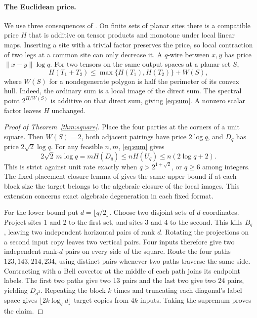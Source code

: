 \documentclass[11pt]{article}
\begin{document}
\paragraph{The Euclidean price.}
We use three consequences of \cite[Thm.~1.1 and the calculus of prices]{price}.
On finite sets of planar sites there is a compatible price \(H\) that is
additive on tensor products and monotone under local linear maps.
Inserting a site with a trivial factor preserves the price, so local
contraction of two legs at a common site can only decrease it.
A \(q\)-wire between \(x,y\) has price \(\|x-y\|\log q\).
For two tensors on the same output spaces at a planar set \(S\),
\begin{equation}\label{eq:sum}
 H(T_1+T_2)\le \max\{H(T_1),H(T_2)\}+W(S),
\end{equation}
where \(W(S)\) for a nondegenerate polygon is half the perimeter of its
convex hull. Indeed, the ordinary sum is a local image of the direct sum.
The spectral point \(2^{H/W(S)}\) is additive on that direct sum, giving
\eqref{eq:sum}. A nonzero scalar factor leaves \(H\) unchanged.

\begin{proof}[Proof of Theorem~\ref{thm:square}]
Place the four parties at the corners of a unit square. Then \(W(S)=2\),
both adjacent pairings have price \(2\log q\), and \(D_q\) has price
\(2\sqrt2\log q\). For any feasible \(n,m\), \eqref{eq:sum} gives
\[
 2\sqrt2\,m\log q=mH(D_q)\le nH(U_q)\le n(2\log q+2).
\]
This is strict against unit rate exactly when \(q>2^{1+\sqrt2}\),
or \(q\ge6\) among integers. The fixed-placement closure lemma of
\cite{price} gives the same upper bound if at each block size the target
belongs to the algebraic closure of the local images. This extension
concerns exact algebraic degeneration in each fixed format.

For the lower bound put \(d=\lfloor q/2\rfloor\). Choose two disjoint
sets of \(d\) coordinates. Project sites 1 and 2 to the first set,
and sites 3 and 4 to the second. This kills \(B_q\), leaving two
independent horizontal pairs of rank \(d\). Rotating the projections on a
second input copy leaves two vertical pairs. Four inputs therefore give
two independent rank-\(d\) pairs on every side of the square. Route
the four paths \(123,143,214,234\), using distinct pairs whenever two
paths traverse the same side. Contracting with a Bell covector at the
middle of each path joins its endpoint labels. The first two paths give
two \(13\) pairs and the last two give two \(24\) pairs, yielding
\(D_{d^2}\). Repeating the block \(k\) times and truncating each
diagonal's label space gives \(\lfloor 2k\log_q d\rfloor\) target copies
from \(4k\) inputs. Taking the supremum proves the claim.
\end{proof}
\end{document}
